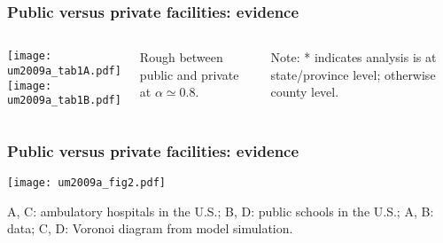 \begin{frame}
  \frametitle{Public versus private facilities: evidence}

  \begin{columns}
    \texttt{[image: um2009a\_tab1A.pdf]}\\
    \texttt{[image: um2009a\_tab1B.pdf]}
      {\small
        Rough  between public and private at $\alpha \simeq 0.8$.

        \medskip

        Note: * indicates analysis is at state/province level; otherwise county level.}
  \end{columns}

\end{frame}

\begin{frame}
  \frametitle{Public versus private facilities: evidence}

  \texttt{[image: um2009a\_fig2.pdf]}

  \alert{A, C:} ambulatory hospitals in the U.S.;
  \alert{B, D:} public schools in the U.S.;
  \alert{A, B:} data; 
  \alert{C, D:} Voronoi diagram from model simulation.

\end{frame}

